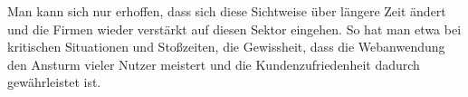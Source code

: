 \documentclass[a4paper,12pt]{article}
\begin{document}
Man kann sich nur erhoffen, dass sich diese Sichtweise über längere Zeit ändert und die Firmen wieder verstärkt auf diesen Sektor eingehen. So hat man etwa bei kritischen Situationen und Stoßzeiten, die Gewissheit, dass die Webanwendung den Ansturm vieler Nutzer meistert und die Kundenzufriedenheit dadurch gewährleistet ist.

\pagebreak
\thispagestyle{empty}


\end{document}
